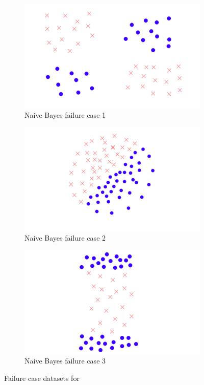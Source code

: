 \documentclass[letterpaper,10pt]{article} %
\begin{document}
\begin{figure}[h!]
\centering
\begin{subfigure}[b]{\textwidth}
\includegraphics[width=\textwidth]{handout/3-2/bayes1}
\caption{Naive Bayes failure case 1}
\label{fig:failbayes1}
\end{subfigure}%

\begin{subfigure}[b]{\textwidth}
\includegraphics[width=\textwidth]{handout/3-2/bayes2}
\caption{Naive Bayes failure case 2}
\label{fig:failbayes2}
\end{subfigure}

\begin{subfigure}[b]{\textwidth}
\includegraphics[width=\textwidth]{handout/3-2/bayes3}
\caption{Naive Bayes failure case 3}
\label{fig:failbayes3}
\end{subfigure}

\caption{Failure case datasets for }\label{fig:failbayes}
\end{figure}
\end{document}
